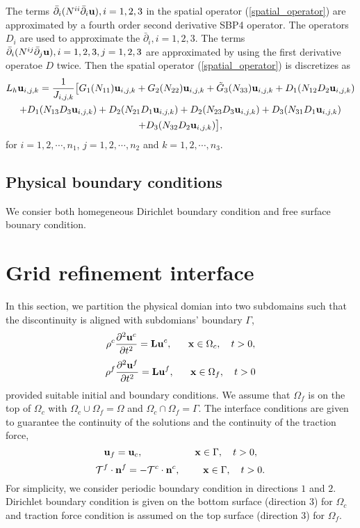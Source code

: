 \documentclass[a4paper]{article}
\begin{document}
The terms $\bar{\partial}_i(N^{ii}\bar{\partial}_i{\bf u}), i = 1,2,3$ in the spatial operator (\ref{spatial_operator}) are approximated by a fourth order second derivative SBP4 operator. The operators $D_i$ are used to approximate the $\bar{\partial}_i, i = 1,2,3$. The terms $\bar{\partial}_i(N^{ij}\bar{\partial}_j{\bf u}), i = 1,2,3, j = 1,2,3$ are approximated by using the first derivative operatoe $D$ twice. Then the spatial operator (\ref{spatial_operator}) is discretizes as
\begin{multline}
L_h{\bf u}_{i,j,k} = \frac{1}{J_{i,j,k}}\big[G_1(N_{11}){\bf u}_{i,j,k}+G_2(N_{22}){\bf u}_{i,j,k}+\tilde{G}_3(N_{33}){\bf u}_{i,j,k}+D_1(N_{12}D_2{\bf u}_{i,j,k})\\
+D_1(N_{13}D_3{\bf u}_{i,j,k})+D_2(N_{21}D_1{\bf u}_{i,j,k})+D_2(N_{23}D_3{\bf u}_{i,j,k})+D_3(N_{31}D_1{\bf u}_{i,j,k})\\
+D_3(N_{32}D_2{\bf u}_{i,j,k})\big],
\end{multline}
for $i = 1,2,\cdots,n_1$, $j = 1,2,\cdots,n_2$ and $k = 1,2,\cdots,n_3$.
 
\subsection{Physical boundary conditions}
We consier both homegeneous Dirichlet boundary condition and free surface bounary condition.

\section{Grid refinement interface}
In this section, we partition the physical domian into two subdomains such that the discontinuity is aligned with subdomians' boundary $\Gamma$,
\begin{equation}\label{coarse_problem}
\rho^c\frac{\partial ^2 {\bf u}^c}{\partial t^2} = {\bf Lu}^c, \ \ \ \ \ {\bf x} \in \Omega_c,\ \ \ t>0,
\end{equation}
\begin{equation}\label{fine_problem}
\rho^f\frac{\partial ^2 {\bf u}^f}{\partial t^2} = {\bf Lu}^f, \ \ \ \ \ {\bf x} \in \Omega_f,\ \ \ t>0
\end{equation}
provided suitable initial and boundary conditions. We assume that $\Omega_f$ is on the top of $\Omega_c$ with $\Omega_c\cup\Omega_f = \Omega$ and $\Omega_c\cap\Omega_f = \Gamma$. The interface conditions are given to guarantee the continuity of the solutions and the continuity of the traction force,
\begin{equation}\label{continuity_sol}
{\bf u}_f = {\bf u}_c, \ \ \ \ \ \ \ \ \ \ \ \ \ \ \ \ {\bf x}\in \Gamma, \ \ \ t>0, 
\end{equation}
\begin{equation}\label{continuity_trac}
\mathcal{T}^f\cdot{\bf n}^f = -\mathcal{T}^c\cdot{\bf n}^c,  \ \ \ \ \ \ \  {\bf x}\in \Gamma, \ \ \ t>0.
\end{equation}
For simplicity, we consider periodic boundary condition in directions $1$ and $2$. Dirichlet boundary condition is given on the bottom surface (direction $3$) for $\Omega_c$ and traction force condition is assumed on the top surface (direction $3$) for $\Omega_f$.
\end{document}
